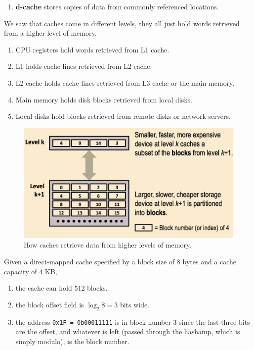 \begin{definition}
\begin{enumerate}
        \item \textbf{d-cache} stores copies of data from commonly referenced locations. 
      \end{enumerate}
      We saw that caches come in different levels, they all just hold words retrieved from a higher level of memory. 
      \begin{enumerate}
        \item CPU registers hold words retrieved from L1 cache. 
        \item L1 holds cache lines retrieved from L2 cache. 
        \item L2 cache holds cache lines retrieved from L3 cache or the main memory.  
        \item Main memory holds disk blocks retrieved from local disks. 
        \item Local disks hold blocks retrieved from remote disks or network servers. 
      \end{enumerate}

      \begin{figure}[H]
        \centering 
        \includegraphics[scale=0.4]{img/cache_retrieve.png}
        \caption{How caches retrieve data from higher levels of memory.} 
        \label{fig:cache_retrieve}
      \end{figure}
    \end{definition}

    \begin{example}
      Given a direct-mapped cache specified by a block size of 8 bytes and a cache capacity of 4 KB, 
      \begin{enumerate}
        \item the cache can hold 512 blocks. 
        \item the block offset field is $\log_2 8 = 3$ bits wide. 
        \item the address \texttt{0x1F = 0b00011111} is in block number $3$ since the last three bits are the offset, and whatever is left (passed through the hashamp, which is simply modulo), is the block number. 
      \end{enumerate}
    \end{example}

